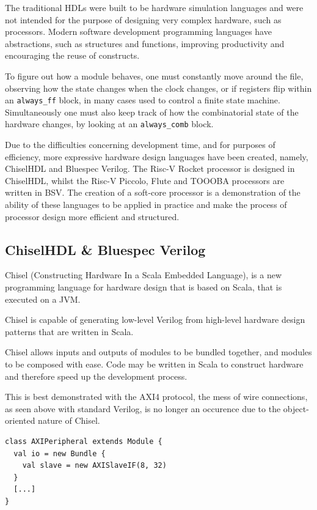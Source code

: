 \documentclass[a4paper,8pt]{report}
\begin{document}
The traditional HDLs were built to be hardware simulation languages and were not
intended for the purpose of designing very complex hardware, such as processors.
Modern software development programming languages have abstractions, such as
structures and functions, improving productivity and encouraging the reuse of
constructs.

To figure out how a module behaves, one must constantly move around the file,
observing how the state changes when the clock changes, or if registers flip
within an \texttt{always\_ff} block, in many cases used to control a finite state
machine. Simultaneously one must also keep track of how the combinatorial state
of the hardware changes, by looking at an \texttt{always\_comb} block.

Due to the difficulties concerning development time, and for purposes of
efficiency, more expressive hardware design languages have been created, namely,
ChiselHDL and Bluespec Verilog. The Risc-V Rocket processor is designed in
ChiselHDL, whilst the Risc-V Piccolo, Flute and TOOOBA processors are written in
BSV. The creation of a soft-core processor is a demonstration of the ability of
these languages to be applied in practice and make the process of processor
design more efficient and structured.

\subsection{ChiselHDL \& Bluespec Verilog}
Chisel (Constructing Hardware In a Scala Embedded Language), is a new
programming language for hardware design that is based on Scala, that is
executed on a JVM.

Chisel is capable of generating low-level Verilog from high-level hardware
design patterns that are written in Scala.

Chisel allows inputs and outputs of modules to be bundled together, and
modules to be composed with ease. Code may be written in Scala to construct
hardware and therefore speed up the development process.


This is best demonstrated with the AXI4 protocol, 
the mess of wire connections, as seen above with standard Verilog, is no longer
an occurence due to the object-oriented nature of Chisel.
\tiny
\begin{verbatim}
class AXIPeripheral extends Module {
  val io = new Bundle {
    val slave = new AXISlaveIF(8, 32)
  }
  [...]
}
\end{verbatim}
\normalsize
\end{document}
